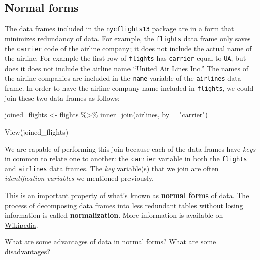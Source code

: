 \documentclass[
  letterpaper,
  DIV=11,
  numbers=noendperiod]{scrreprt}
\newenvironment{Shaded}{\begin{snugshade}}{\end{snugshade}}
\newcommand{\AttributeTok}[1]{\textcolor[rgb]{0.40,0.45,0.13}{#1}}
\newcommand{\FunctionTok}[1]{\textcolor[rgb]{0.28,0.35,0.67}{#1}}
\newcommand{\NormalTok}[1]{\textcolor[rgb]{0.00,0.23,0.31}{#1}}
\newcommand{\OtherTok}[1]{\textcolor[rgb]{0.00,0.23,0.31}{#1}}
\newcommand{\SpecialCharTok}[1]{\textcolor[rgb]{0.37,0.37,0.37}{#1}}
\newcommand{\StringTok}[1]{\textcolor[rgb]{0.13,0.47,0.30}{#1}}
\theoremstyle{definition}
\theoremstyle{remark}
\begin{document}
\hypertarget{normal-forms}{%
\subsection{Normal forms}\label{normal-forms}}

The data frames included in the \texttt{nycflights13} package are in a
form that minimizes redundancy of data. For example, the
\texttt{flights} data frame only saves the \texttt{carrier} code of the
airline company; it does not include the actual name of the airline. For
example the first row of \texttt{flights} has \texttt{carrier} equal to
\texttt{UA}, but does it does not include the airline name ``United Air
Lines Inc.'' The names of the airline companies are included in the
\texttt{name} variable of the \texttt{airlines} data frame. In order to
have the airline company name included in \texttt{flights}, we could
join these two data frames as follows:

\begin{Shaded}
\begin{Highlighting}[]
\NormalTok{joined\_flights }\OtherTok{\textless{}{-}}\NormalTok{ flights }\SpecialCharTok{\%\textgreater{}\%} 
  \FunctionTok{inner\_join}\NormalTok{(airlines, }\AttributeTok{by =} \StringTok{"carrier"}\NormalTok{)}

\FunctionTok{View}\NormalTok{(joined\_flights)}
\end{Highlighting}
\end{Shaded}

We are capable of performing this join because each of the data frames
have \emph{keys} in common to relate one to another: the
\texttt{carrier} variable in both the \texttt{flights} and
\texttt{airlines} data frames. The \emph{key} variable(s) that we join
are often \emph{identification variables} we mentioned previously.

This is an important property of what's known as \textbf{normal forms}
of data. The process of decomposing data frames into less redundant
tables without losing information is called \textbf{normalization}. More
information is available on
\href{https://en.wikipedia.org/wiki/Database_normalization}{Wikipedia}.

\begin{tcolorbox}[enhanced jigsaw, coltitle=black, toprule=.15mm, bottomtitle=1mm, breakable, leftrule=.75mm, title={{🎯} Learning Check 3.16}, opacitybacktitle=0.6, colback=white, rightrule=.15mm, opacityback=0, toptitle=1mm, colbacktitle=quarto-callout-tip-color!10!white, colframe=quarto-callout-tip-color-frame, titlerule=0mm, arc=.35mm, bottomrule=.15mm, left=2mm]
What are some advantages of data in normal forms? What are some
disadvantages?
\end{tcolorbox}
\end{document}
